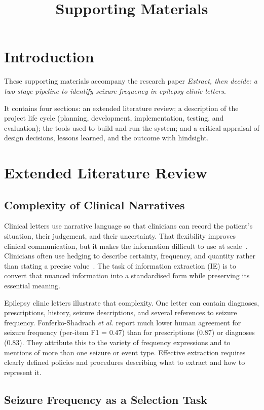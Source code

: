 \documentclass[conference]{IEEEtran}
\begin{document}
\title{Supporting Materials\\}

\section{Introduction}

These supporting materials accompany the research paper
\emph{Extract, then decide: a two-stage pipeline to identify seizure 
frequency in epilepsy clinic letters}.

It contains four sections: an extended literature review; a 
description of the project life cycle (planning, development, 
implementation, testing, and evaluation); the tools used 
to build and run the system; and a critical appraisal of 
design decisions, lessons learned, and the outcome with 
hindsight.

\section{Extended Literature Review}

\subsection{Complexity of Clinical Narratives}

Clinical letters use narrative language so that clinicians can 
record the patient's situation, their judgement, and their 
uncertainty. That flexibility improves clinical communication, 
but it makes the information difficult to use at scale~\cite{b1}. 
Clinicians often use hedging to describe certainty, frequency, 
and quantity rather than stating a precise value~\cite{b2}. 
The task of information extraction (IE) is to convert that
nuanced information into a standardised form while
preserving its essential meaning.

Epilepsy clinic letters illustrate that complexity. One letter 
can contain diagnoses, prescriptions, history, seizure 
descriptions, and several references to seizure frequency. 
Fonferko-Shadrach \emph{et al.} report much lower human 
agreement for seizure frequency (per-item F1 = 0.47) than 
for prescriptions (0.87) or diagnoses (0.83)\cite{b3}. They 
attribute this to the variety of frequency expressions and to 
mentions of more than one seizure or event type. 
Effective extraction requires clearly defined policies and
procedures describing what to extract and how to 
represent it.

\subsection{Seizure Frequency as a Selection Task}
\end{document}
